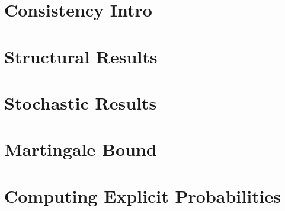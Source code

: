 \chapter{Consistency Intro}

\chapter{Structural Results}
\chapter{Stochastic Results}
\chapter{Martingale Bound}
\chapter{Computing Explicit Probabilities}
